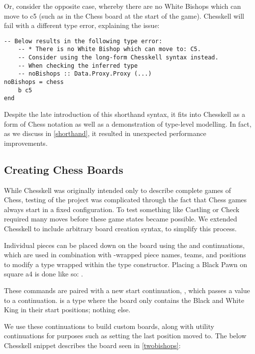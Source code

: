 Or, consider the opposite case, whereby there are no White Bishops which can move to c5 (such as in the Chess board at the start of the game). Chesskell will fail with a different type error, explaining the issue:

\begin{lstlisting}
-- Below results in the following type error:
    -- * There is no White Bishop which can move to: C5.
    -- Consider using the long-form Chesskell syntax instead.
    -- When checking the inferred type
    -- noBishops :: Data.Proxy.Proxy (...)
noBishops = chess
    b c5
end
\end{lstlisting}

Despite the late introduction of this shorthand syntax, it fits into Chesskell as a form of Chess notation as well as a demonstration of type-level modelling. In fact, as we discuss in \cref{shorthand}, it resulted in unexpected performance improvements.

\subsection{Creating Chess Boards} \label{boardcreation}

While Chesskell was originally intended only to describe complete games of Chess, testing of the project was complicated through the fact that Chess games always start in a fixed configuration. To test something like Castling or Check required many moves before these game states became possible. We extended Chesskell to include arbitrary board creation syntax, to simplify this process.

Individual pieces can be placed down on the board using the  and  continuations, which are used in combination with -wrapped piece names, teams, and positions to modify a  type wrapped within the  type constructor. Placing a Black Pawn on square a4 is done like so: .

These commands are paired with a new start continuation, , which passes a  value to a continuation.  is a  type where the board only contains the Black and White King in their start positions; nothing else.

We use these continuations to build custom boards, along with utility continuations for purposes such as setting the last position moved to. The below Chesskell snippet describes the board seen in \cref{twobishops}:

